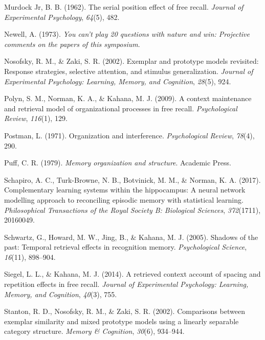 \documentclass[
  letterpaper,
  DIV=11,
  numbers=noendperiod]{scrreport}
\newlength{\cslhangindent}
\newlength{\cslentryspacingunit} %
\newenvironment{CSLReferences}[2] %
 {%
  \setlength{\parindent}{0pt}
  \ifodd #1
  \let\oldpar\par
  \def\par{\hangindent=\cslhangindent\oldpar}
  \fi
  \setlength{\parskip}{#2\cslentryspacingunit}
 }%
 {}
\begin{document}
\begin{CSLReferences}{1}{0}
\leavevmode{}%
Murdock Jr, B. B. (1962). The serial position effect of free recall.
\emph{Journal of Experimental Psychology}, \emph{64}(5), 482.

\leavevmode{}%
Newell, A. (1973). \emph{You can't play 20 questions with nature and
win: Projective comments on the papers of this symposium}.

\leavevmode{}%
Nosofsky, R. M., \& Zaki, S. R. (2002). Exemplar and prototype models
revisited: Response strategies, selective attention, and stimulus
generalization. \emph{Journal of Experimental Psychology: Learning,
Memory, and Cognition}, \emph{28}(5), 924.

\leavevmode{}%
Polyn, S. M., Norman, K. A., \& Kahana, M. J. (2009). A context
maintenance and retrieval model of organizational processes in free
recall. \emph{Psychological Review}, \emph{116}(1), 129.

\leavevmode{}%
Postman, L. (1971). Organization and interference. \emph{Psychological
Review}, \emph{78}(4), 290.

\leavevmode{}%
Puff, C. R. (1979). \emph{Memory organization and structure}. Academic
Press.

\leavevmode{}%
Schapiro, A. C., Turk-Browne, N. B., Botvinick, M. M., \& Norman, K. A.
(2017). Complementary learning systems within the hippocampus: A neural
network modelling approach to reconciling episodic memory with
statistical learning. \emph{Philosophical Transactions of the Royal
Society B: Biological Sciences}, \emph{372}(1711), 20160049.

\leavevmode{}%
Schwartz, G., Howard, M. W., Jing, B., \& Kahana, M. J. (2005). Shadows
of the past: Temporal retrieval effects in recognition memory.
\emph{Psychological Science}, \emph{16}(11), 898--904.

\leavevmode{}%
Siegel, L. L., \& Kahana, M. J. (2014). A retrieved context account of
spacing and repetition effects in free recall. \emph{Journal of
Experimental Psychology: Learning, Memory, and Cognition}, \emph{40}(3),
755.

\leavevmode{}%
Stanton, R. D., Nosofsky, R. M., \& Zaki, S. R. (2002). Comparisons
between exemplar similarity and mixed prototype models using a linearly
separable category structure. \emph{Memory \& Cognition}, \emph{30}(6),
934--944.


\end{CSLReferences}
\end{document}
